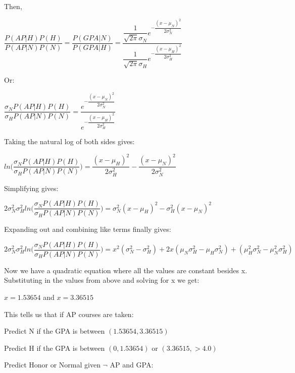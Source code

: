 \documentclass[11pt]{article}
\begin{document}
Then,

\begin{center}
$\dfrac{P(AP|H)P(H)}{P(AP|N)P(N)} = \dfrac{P(GPA|N)}{P(GPA|H)} = \dfrac{\dfrac{1}{\sqrt{2\pi}\sigma_N}e^{-\dfrac{(x-\mu_N)^2}{2\sigma_N^2}}}{\dfrac{1}{\sqrt{2\pi}\sigma_H}e^{-\dfrac{(x-\mu_H)^2}{2\sigma_H^2}}}$
\end{center}

Or:
\begin{center}
$\dfrac{\sigma_N P(AP|H)P(H)}{\sigma_H P(AP|N)P(N)} = \dfrac{e^{-\dfrac{(x-\mu_N)^2}{2\sigma_N^2}}}{e^{-\dfrac{(x-\mu_H)^2}{2\sigma_H^2}}}$
\end{center}

Taking the natural log of both sides gives:

\begin{center}
$ln \bigg( \dfrac{\sigma_N P(AP|H)P(H)}{\sigma_H P(AP|N)P(N)} \bigg) = {\dfrac{(x-\mu_H)^2}{2\sigma_H^2}} - \dfrac{(x-\mu_N)^2}{2\sigma_N^2}$
\end{center}

Simplifying gives:
\begin{center}
$2\sigma_N^2\sigma_H^2ln \bigg( \dfrac{\sigma_N P(AP|H)P(H)}{\sigma_H P(AP|N)P(N)} \bigg) = \sigma^2_N (x-\mu_H)^2 - \sigma^2_H (x-\mu_N)^2$
\end{center}

Expanding out and combining like terms finally gives:
\begin{center}
$2\sigma_N^2\sigma_H^2ln \bigg( \dfrac{\sigma_N P(AP|H)P(H)}{\sigma_H P(AP|N)P(N)} \bigg) = x^2(\sigma_N^2-\sigma_H^2) + 2x(\mu_N\sigma_H^2-\mu_H\sigma_N^2)+(\mu_H^2\sigma_N^2 - \mu_N^2\sigma_H^2)$
\end{center}

Now we have a quadratic equation where all the values are constant besides x. Substituting in the values from above and solving for x we get:

\begin{center}
$x = 1.53654$ and $x = 3.36515$
\end{center}

This tells us that if AP courses are taken:\newline

Predict N if the GPA is between $(1.53654, 3.36515)$\newline

Predict H if the GPA is between $(0, 1.53654)$ or $(3.36515, >4.0)$\newline


\noindent Predict Honor or Normal given $\neg$ AP and GPA:\newline
\end{document}
